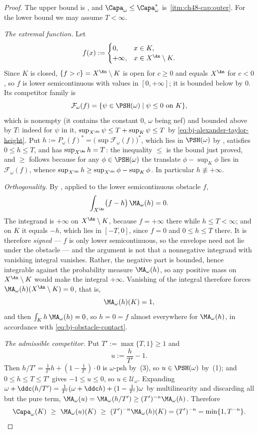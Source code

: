 \begin{proof}
The upper bound is , and
$\Capa_\omega\le\Capa^*_\omega$ is
\,\cref{itm:ch48-cap:outer}.  For the
lower bound we may assume $T<\infty$.

\emph{The extremal function.}  Let
\[
 f(x):=
 \begin{cases}
  0,&x\in K,\\
  +\infty,&x\in X^{\An}\setminus K.
 \end{cases}
\]
Since $K$ is closed, $\{f>c\}=X^{\An}\setminus K$ is open for
$c\ge0$ and equals $X^{\An}$ for $c<0$, so $f$ is lower
semicontinuous with values in $[0,+\infty]$; it is bounded below by
$0$.  Its competitor family is
\[
 \mathcal F_\omega(f)=\{\psi\in\PSH(\omega)\mid\psi\le0\ \text{on}\ K\},
\]
which is nonempty (it contains the constant $0$, $\omega$ being nef) and
bounded above by $T$: indeed for $\psi$ in it,
$\sup_{X^{\An}}\psi\le T+\sup_K\psi\le T$ by
\eqref{eq:bj-alexander-taylor-height}.  Put
$h:=P_\omega(f)^*=\bigl(\sup\mathcal F_\omega(f)\bigr)^*$, which lies in
$\PSH(\omega)$ by , satisfies $0\le h\le T$,
and has $\sup_{X^{\An}}h=T$: the inequality $\le$ is the bound just
proved, and $\ge$ follows because for any $\phi\in\PSH(\omega)$ the
translate $\phi-\sup_K\phi$ lies in $\mathcal F_\omega(f)$, whence
$\sup_{X^{\An}}h\ge\sup_{X^{\An}}\phi-\sup_K\phi$.  In particular
$h\not\equiv+\infty$.

\emph{Orthogonality.}  By ,
applied to the lower semicontinuous obstacle $f$,
\[
 \int_{X^{\An}}\bigl(f-h\bigr)\,\MA_\omega(h)=0 .
\]
The integrand is $+\infty$ on $X^{\An}\setminus K$, because $f=+\infty$
there while $h\le T<\infty$; and on $K$ it equals $-h$, which lies in
$[-T,0]$, since $f=0$ and $0\le h\le T$ there.  It is therefore
\emph{signed} --- $f$ is only lower semicontinuous, so the envelope need
not lie under the obstacle --- and the argument is not that a nonnegative
integrand with vanishing integral vanishes.  Rather, the negative part is
bounded, hence integrable against the probability measure
$\MA_\omega(h)$, so any positive mass on $X^{\An}\setminus K$ would make
the integral $+\infty$.  Vanishing of the integral therefore forces
$\MA_\omega(h)(X^{\An}\setminus K)=0$, that is,
\[
 \MA_\omega(h)(K)=1 ,
\]
and then $\int_Kh\,\MA_\omega(h)=0$, so $h=0=f$ almost everywhere for
$\MA_\omega(h)$, in accordance with \eqref{eq:bj-obstacle-contact}.

\emph{The admissible competitor.}  Put $T':=\max\{T,1\}\ge1$ and
\[
 u:=\frac h{T'}-1 .
\]
Then $h/T'=\tfrac1{T'}h+(1-\tfrac1{T'})\cdot0$ is $\omega$-psh by
\,(3), so $u\in\PSH(\omega)$ by
\,(1); and $0\le h\le T\le T'$ gives
$-1\le u\le0$, so $u\in\mathcal U_\omega$.  Expanding
$\omega+\ddc(h/T')=\tfrac1{T'}(\omega+\ddc h)+(1-\tfrac1{T'})\omega$ by
multilinearity and discarding all but the pure term,
$\MA_\omega(u)=\MA_\omega(h/T')\ge(T')^{-n}\MA_\omega(h)$.  Therefore
\[
 \Capa_\omega(K)\ \ge\ \MA_\omega(u)(K)\ \ge\ (T')^{-n}\MA_\omega(h)(K)
 =(T')^{-n}=\min\{1,T^{-n}\} .
\]


\end{proof}
